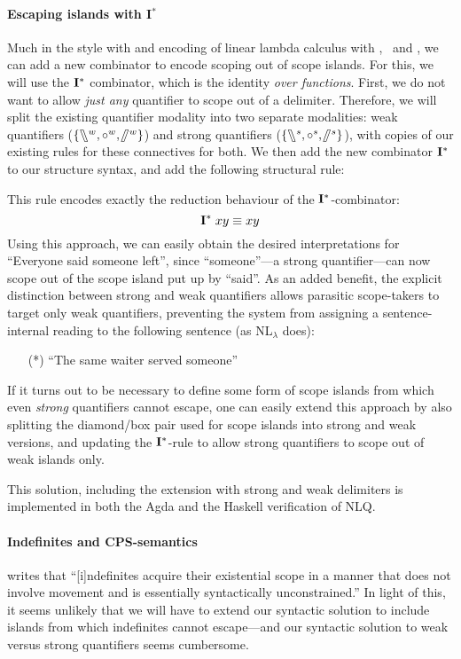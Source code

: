 \paragraph*{Escaping islands with I$^*$}
Much in the style with \citet{finger2001} and 
encoding of linear lambda calculus with \I, \B\ and \C, we can add a
new combinator to encode scoping out of scope islands. For this, we
will use the $\I^*$ combinator, which is the identity \emph{over
functions}. First, we do not want to allow \emph{just any} quantifier
to scope out of a delimiter. Therefore, we will split the existing
quantifier modality into two separate modalities: weak quantifiers
($\{\fatbslash^w,\mathbin{\circ}^w,\!\!\fatslash\:^w\}$) and strong quantifiers
($\{\fatbslash^s,\mathbin{\circ}^s,\!\!\fatslash\:^s\}$), with copies of our existing rules
for these connectives for both. We then add the new combinator $\I^*$
to our structure syntax, and add the following structural rule:
\begin{pfblock}
  \doubleLine\RightLabel{$\I^*$}
\end{pfblock}
This rule encodes exactly the reduction behaviour of the
$\I^*$-combinator:
\[
  \mathbf{I}^*\;xy\equiv xy
\]
Using this approach, we can easily obtain the desired interpretations
for ``Everyone said someone left'', since ``someone''---a strong
quantifier---can now scope out of the scope island put up by
``said''. As an added benefit, the explicit distinction between strong
and weak quantifiers allows parasitic scope-takers to target only weak
quantifiers, preventing the system from assigning a sentence-internal
reading to the following sentence (as NL$_\lambda$ does):
\begin{itemize}
\item[(*)] ``The same waiter served someone''
\end{itemize}

If it turns out to be necessary to define some form of scope islands
from which even \emph{strong} quantifiers cannot escape, one can
easily extend this approach by also splitting the diamond/box pair
used for scope islands into strong and weak versions, and updating the
$\I^*$-rule to allow strong quantifiers to scope out of weak islands
only.

This solution, including the extension with strong and weak delimiters
is implemented in both the Agda and the Haskell verification of NLQ.

\paragraph{Indefinites and CPS-semantics}
\citet{szabolcsi2000} writes that ``[i]ndefinites acquire their
existential scope in a manner that does not involve movement and is
essentially syntactically unconstrained.'' In light of this, it seems
unlikely that we will have to extend our syntactic solution to include
islands from which indefinites cannot escape---and our syntactic
solution to weak versus strong quantifiers seems cumbersome.

